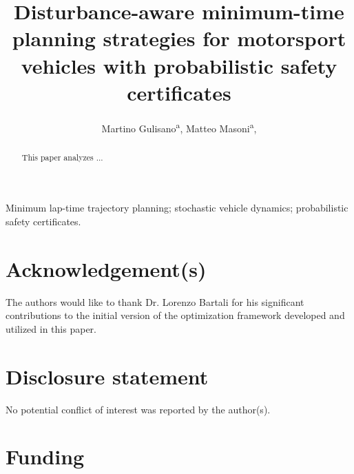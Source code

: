 \documentclass[]{interact}
\theoremstyle{plain}%
\theoremstyle{definition}
\theoremstyle{remark}
\begin{document}

\title{Disturbance-aware minimum-time planning strategies for motorsport vehicles with probabilistic safety certificates}

\author{Martino Gulisano\textsuperscript{a}, Matteo Masoni\textsuperscript{a}, 
}

\maketitle

\begin{abstract}
This paper analyzes ...
\end{abstract}

\begin{keywords}
Minimum lap-time trajectory planning; stochastic vehicle dynamics; probabilistic safety certificates.
\end{keywords}










\section*{Acknowledgement(s)}

The authors would like to thank Dr. Lorenzo Bartali for his significant contributions to the initial version of the optimization framework developed and utilized in this paper.


\section*{Disclosure statement}

No potential conflict of interest was reported by the author(s).

\section*{Funding}
\end{document}
